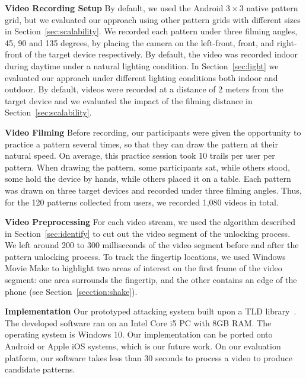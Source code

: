    \noindent\textbf{Video Recording Setup}
    By default, we used the  Android $3 \times 3$ native pattern grid,
    but we evaluated our approach using other pattern grids with different sizes in
    Section~\ref{sec:scalability}. We recorded each pattern under three filming
    angles, 45, 90 and 135 degrees, by placing the camera on the left-front, front, and right-front
    of the target device respectively.
    By default, the video
    was recorded indoor during daytime under a natural lighting condition. In
    Section~\ref{sec:light} we evaluated our approach under different lighting conditions
    both indoor and outdoor. By default, videos were recorded at a distance of
    2 meters from the target device and we evaluated the impact of the filming distance in
    Section~\ref{sec:scalability}.

    \noindent \textbf{Video Filming}
     Before recording, our participants were given the opportunity to practice a pattern
    several times, so that they can draw the pattern at
    their natural speed. On average, this practice session took 10 trails per user per pattern.
    When drawing the
    pattern, some participants sat, while others stood, some hold the device
    by hands, while others placed it on a table.
    Each pattern was drawn on three target devices and
    recorded under three filming angles. Thus, for the 120 patterns collected from users, we recorded 1,080 videos in total.

    \noindent\textbf{Video Preprocessing}
    For each video stream, we used the algorithm described in Section~\ref{sec:identify} to cut out the video segment
    of the unlocking process. We left around 200 to 300 milliseconds of the video segment before and after the pattern unlocking process.
    To track the fingertip locations,
    we used Windows Movie Make to highlight two areas of interest on the first frame of
    the video segment: one area surrounds the fingertip, and the other contains an edge of the
    phone (see Section~\ref {secction:shake}).

   \noindent\textbf{Implementation} Our prototyped attacking system built upon a TLD library~\cite{TLD-toolbox-web}.
    The developed software ran on an Intel Core i5 PC with
    8GB RAM. The operating system is Windows 10. Our implementation can be ported onto
    Android or Apple iOS systems, which is our future work. On our evaluation
    platform, our software takes less than 30 seconds to process a video to produce candidate patterns.
